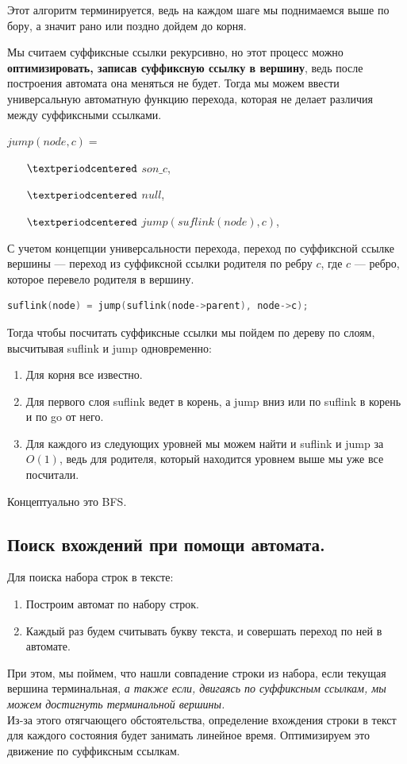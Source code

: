 Этот алгоритм терминируется, ведь на каждом шаге мы поднимаемся выше по бору, а значит рано или поздно дойдем до корня.

Мы считаем суффиксные ссылки рекурсивно, но этот процесс можно \textbf{оптимизировать, записав суффиксную ссылку в вершину}, ведь после построения автомата она меняться не будет.
Тогда мы можем ввести универсальную автоматную функцию перехода, которая не делает различия между суффиксными ссылками.

$jump(node, c) = $
\begin{itemize}
    \item[$\textperiodcentered$] $son\_c$, 
    \item[$\textperiodcentered$] $null$, 
    \item[$\textperiodcentered$] $jump(suflink(node), c)$, 
\end{itemize}

С учетом концепции универсальности перехода, переход по суффиксной ссылке вершины --- переход из суффиксной ссылки родителя по ребру $c$, где  $c$ --- ребро, которое перевело родителя в вершину.
\begin{lstlisting}[language = C++]
    suflink(node) = jump(suflink(node->parent), node->c); 
\end{lstlisting}

Тогда чтобы посчитать суффиксные ссылки мы пойдем по дереву по слоям, высчитывая suflink и jump одновременно:
\begin{enumerate}
    \item Для корня все известно.
    \item Для первого слоя suflink ведет в корень, а jump вниз или по suflink в корень и по go от него.
    \item Для каждого из следующих уровней мы можем найти и suflink и jump за $O(1)$, ведь для родителя, который находится уровнем выше мы уже все посчитали.
\end{enumerate}
Концептуально это BFS.

\subsection{Поиск вхождений при помощи автомата.}
Для поиска набора строк в тексте:
\begin{enumerate}
    \item Построим автомат по набору строк. 
    \item Каждый раз будем считывать букву текста, и совершать переход по ней в автомате.
\end{enumerate}
При этом, мы поймем, что нашли совпадение строки из набора, если текущая вершина терминальная, \textit{а также если, двигаясь по суффиксным ссылкам, мы можем достигнуть терминальной вершины.} \\
Из-за этого отягчающего обстоятельства, определение вхождения строки в текст для каждого состояния будет занимать линейное время.
Оптимизируем это движение по суффиксным ссылкам.

